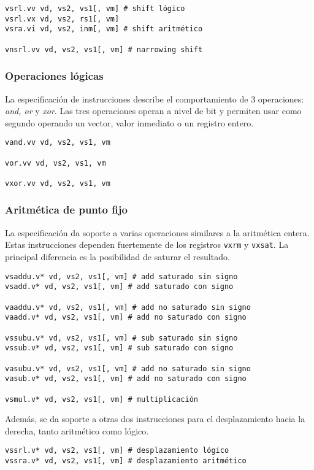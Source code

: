 \begin{lstlisting}
vsrl.vv vd, vs2, vs1[, vm] # shift lógico
vsrl.vx vd, vs2, rs1[, vm] 
vsra.vi vd, vs2, inm[, vm] # shift aritmético

vnsrl.vv vd, vs2, vs1[, vm] # narrowing shift
\end{lstlisting}


\subsubsection{Operaciones lógicas}

La especificación de instrucciones describe el comportamiento de 3 operaciones:
\textit{and, or} y \textit{xor}. Las tres operaciones operan a nivel de bit y
permiten usar como segundo operando un vector, valor inmediato o un registro
entero.

\begin{lstlisting}
vand.vv vd, vs2, vs1, vm

vor.vv vd, vs2, vs1, vm

vxor.vv vd, vs2, vs1, vm
\end{lstlisting}

\subsubsection{Aritmética de punto fijo}

La especificación da soporte a varias operaciones similares a la aritmética
entera. Estas instrucciones dependen fuertemente de los registros \texttt{vxrm}
y \texttt{vxsat}. La principal diferencia es la posibilidad de saturar el
resultado.

\begin{lstlisting}
vsaddu.v* vd, vs2, vs1[, vm] # add saturado sin signo
vsadd.v* vd, vs2, vs1[, vm] # add saturado con signo

vaaddu.v* vd, vs2, vs1[, vm] # add no saturado sin signo
vaadd.v* vd, vs2, vs1[, vm] # add no saturado con signo

vssubu.v* vd, vs2, vs1[, vm] # sub saturado sin signo
vssub.v* vd, vs2, vs1[, vm] # sub saturado con signo

vasubu.v* vd, vs2, vs1[, vm] # add no saturado sin signo
vasub.v* vd, vs2, vs1[, vm] # add no saturado con signo

vsmul.v* vd, vs2, vs1[, vm] # multiplicación

\end{lstlisting}

Además, se da soporte a otras dos instrucciones para el desplazamiento hacia la
derecha, tanto aritmético como lógico.
\begin{lstlisting}
vssrl.v* vd, vs2, vs1[, vm] # desplazamiento lógico
vssra.v* vd, vs2, vs1[, vm] # desplazamiento aritmético
\end{lstlisting}

